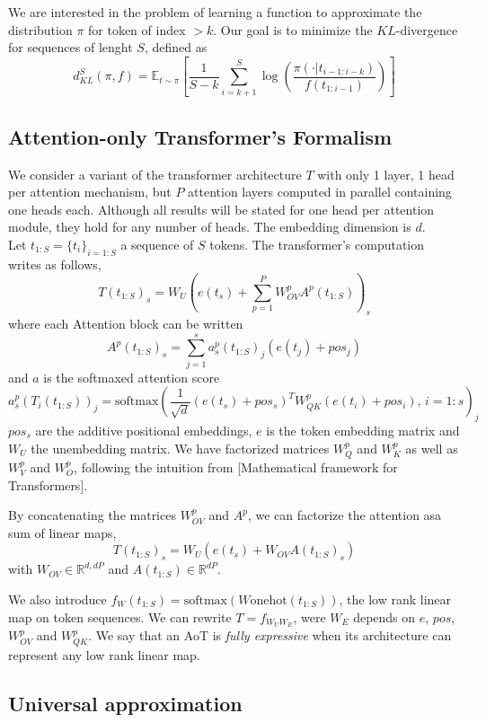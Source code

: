 \documentclass{article}
\begin{document}
We are interested in the problem of learning a function to approximate the distribution $\pi$ for token of index $>k$. Our goal is to 
minimize the $KL$-divergence for sequences of lenght $S$, defined as 
\[d_{KL}^S(\pi, f) = \mathbb{E}_{t\sim\pi}\left[\frac{1}{S-k}\sum_{i=k+1}^S\log\left(\frac{\pi(\cdot|t_{i-1:i-k})}{f(t_{1:i-1})}\right)\right]\]



\subsection{Attention-only Transformer's Formalism}

We consider a variant of the transformer architecture $T$ with only 1 layer, 1 head per attention mechanism, but $P$ attention layers 
computed in parallel containing one heads each. Although all results will be stated for one head per attention module, 
they hold for any number of heads. The embedding dimension is $d$.\\
Let $t_{1:S} = \{t_i\}_{i=1:S}$ a sequence of $S$ tokens. The transformer's computation writes as follows,
\[T(t_{1:S})_s = W_U\left(e(t_s)+\sum_{p=1}^PW_{OV}^{p}A^p(t_{1:S})\right)_s\] where each Attention block can be written 
\[A^{p}(t_{1:S})_s = \sum_{j=1}^sa_s^{p}(t_{1:S})_j(e(t_j)+pos_j)\] and $a$ is the softmaxed attention score
\[a_s^{p}(T_{i}(t_{1:S}))_j = \text{softmax}\left(\frac{1}{\sqrt{d}}(e(t_s)+pos_s)^TW_{QK}^{p}(e(t_i)+pos_i), \, i=1:s\right)_j\] 
$pos_s$ are the additive positional embeddings, $e$ is the token embedding matrix and $W_U$ the unembedding matrix. We have factorized matrices 
$W_Q^p$ and $W_K^p$ as well as $W_V^p$ and $W_O^p$, following the intuition from [Mathematical framework for Transformers].
\bigbreak

By concatenating the matrices $W_{OV}^p$ and $A^p$, we can factorize the attention asa sum of linear maps,
\[T(t_{1:S})_s = W_U(e(t_{s}) + W_{OV}A(t_{1:S})_s)\]
with $W_{OV}\in \mathbb{R}^{d, dP} $ and $A(t_{1:S})\in \mathbb{R}^{dP}$. 
\bigbreak

We also introduce $f_W(t_{1:S}) = \text{softmax}(W\text{onehot}(t_{1:S}))$, the low rank linear map on token sequences.
We can rewrite $T = f_{W_UW_E}$, were $W_E$ depends on $e$, $pos$, $W_{OV}^p$ and $W_{QK}^p$. We say that an AoT is 
\textit{fully expressive} when its architecture can represent any low rank linear map.

\subsection{Universal approximation}
\end{document}
